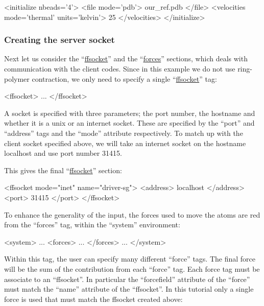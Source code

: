 \documentclass[11pt,english,fleqn]{report}
\newenvironment{code}{%
\footnotesize 
\verbatim
}{
\endverbatim
\normalsize
}
\begin{document}
\begin{code}
<initialize nbeads='4'>
   <file mode='pdb'> our_ref.pdb </file>
   <velocities mode='thermal' units='kelvin'> 25 </velocities>
</initialize>
\end{code}

\subsubsection{Creating the server socket}

Next let us consider the {}``\hyperref[FFSOCKET]{ffsocket}'' and the 
{}``\hyperref[FORCES]{forces}'' sections, which deals with communication
with the client codes. Since in this example we do not use ring-polymer contraction,
we only need to specify a single {}``\hyperref[FFSOCKET]{ffsocket}'' tag:

\begin{code}
<ffsocket>
   ...
</ffsocket>
\end{code}

A socket is specified with three parameters; the port number, the
hostname and whether it is a unix or an internet socket. 
These are specified by the {}``port'' and {}``address'' tags
and the {}``mode'' attribute respectively.
To match up with the client socket specified above,
we will take an internet socket on the hostname localhost and
use port number 31415. 

This gives the final {}``\hyperref[FFSOCKET]{ffsocket}'' section:

\begin{code}
<ffsocket mode="inet" name="driver-sg">
   <address> localhost </address>
   <port> 31415 </port>
</ffsocket>
\end{code}

To enhance the generality of the input, the forces used to move the
atoms are red from the ``forces'' tag, within the ``system'' environment:

\begin{code}
<system>
   ...
   <forces>
      ...
   </forces>
   ...
</system>
\end{code}

Within this tag, the user can specify many different ``force''
tags. The final force will be the sum of the contribution from each
``force'' tag. Each force tag must be associate to an
``ffsocket''. In particular the ``forcefield'' attribute of the
``force'' must match the ``name'' attribute of the ``ffsocket''. In
this tutorial only a single force is used that must match the ffsocket
created above:
\end{document}
